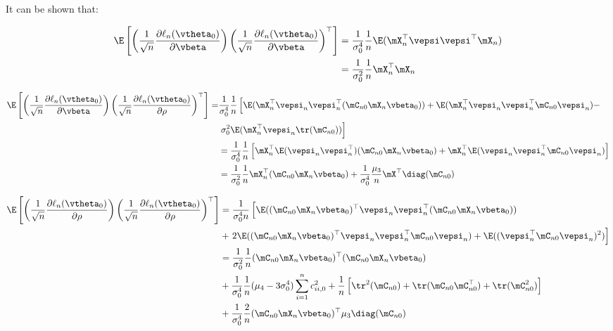 \begin{subappendices}
It can be shown that:

\begin{equation}
\begin{aligned}
\E\left[\left(\frac{1}{\sqrt{n}}\frac{\partial \ell_n(\vtheta_0)}{\partial \vbeta}\right) \left(\frac{1}{\sqrt{n}}\frac{\partial \ell_n(\vtheta_0)}{\partial \vbeta}\right)^\top\right] & = \frac{1}{\sigma_0^4}\frac{1}{n}\E(\mX_n^\top\vepsi\vepsi^\top\mX_n) \\
& = \frac{1}{\sigma_0^2}\frac{1}{n}\mX_n^\top\mX_n
\end{aligned}
\end{equation}

\begin{equation}
\begin{aligned}
\E\left[\left(\frac{1}{\sqrt{n}}\frac{\partial \ell_n(\vtheta_0)}{\partial \vbeta}\right) \left(\frac{1}{\sqrt{n}}\frac{\partial \ell_n(\vtheta_0)}{\partial \rho}\right)^\top\right]  = &  \frac{1}{\sigma_0^4}\frac{1}{n}\left[\E(\mX_n^\top\vepsi_n\vepsi_n^\top(\mC_{n0}\mX_n\vbeta_0)) + \E(\mX_n^\top\vepsi_n\vepsi_n^\top\mC_{n0}\vepsi_n) - \right. \\
& \left. \sigma_0^2\E(\mX_n^\top\vepsi_n\tr(\mC_{n0})) \right] \\
& = \frac{1}{\sigma_0^4}\frac{1}{n}\left[\mX_n^\top\E(\vepsi_n\vepsi_n^\top)(\mC_{n0}\mX_n\vbeta_0) + \mX_n^\top\E(\vepsi_n\vepsi_n^\top\mC_{n0}\vepsi_n)\right] \\
& = \frac{1}{\sigma_0^2}\frac{1}{n}\mX_n^\top(\mC_{n0}\mX_n\vbeta_0) + \frac{1}{\sigma_0^4}\frac{\mu_3}{n}\mX^\top\diag(\mC_{n0})
\end{aligned}
\end{equation}

\begin{equation}
\begin{aligned}
  \E\left[\left(\frac{1}{\sqrt{n}}\frac{\partial \ell_n(\vtheta_0)}{\partial \rho}\right) \left(\frac{1}{\sqrt{n}}\frac{\partial \ell_n(\vtheta_0)}{\partial \rho}\right)^\top\right] & = \frac{1}{\sigma_0^4n}\left[\E((\mC_{n0}\mX_n\vbeta_0)^\top \vepsi_n\vepsi_n^\top(\mC_{n0}\mX_n\vbeta_0))\right. \\
  & + \left.2\E((\mC_{n0}\mX_n\vbeta_0)^\top \vepsi_n\vepsi_n^\top\mC_{n0}\vepsi_n) + \E((\vepsi_n^\top\mC_{n0}\vepsi_n)^2)\right] \\
  & = \frac{1}{\sigma_0^2}\frac{1}{n}(\mC_{n0}\mX_n\vbeta_0)^\top(\mC_{n0}\mX_n\vbeta_0) \\
  & +  \frac{1}{\sigma_0^4}\frac{1}{n}(\mu_4 - 3\sigma^4_0)\sum_{i = 1}^nc_{ii,0}^2 + \frac{1}{n}\left[\tr^2(\mC_{n0}) + \tr(\mC_{n0}\mC_{n0}^\top)+\tr(\mC_{n0}^2)\right] \\
  & + \frac{1}{\sigma_0^4}\frac{2}{n}(\mC_{n0}\mX_n\vbeta_0)^\top\mu_3\diag(\mC_{n0})
\end{aligned}
\end{equation}




\end{subappendices}
